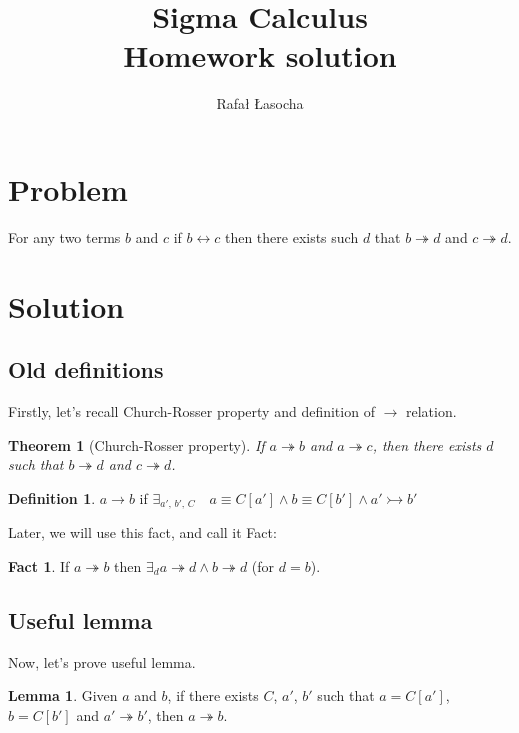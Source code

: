\documentclass[a4paper,11pt]{article}
\title{
  \textbf{Sigma Calculus}\\
  {\Large Homework solution}
}
\author{Rafał Łasocha}
\newtheorem{theorem}{Theorem}
\theoremstyle{definition}
\newtheorem*{lemma}{Lemma}
\newtheorem*{definition}{Definition}
\newtheorem*{fact}{Fact}
\begin{document}
\maketitle

\section{Problem}

For any two terms $b$ and $c$ if $b \leftrightarrow c$ then there exists such $d$ that $b \twoheadrightarrow d$
and $c \twoheadrightarrow d$.

\section{Solution}

\subsection{Old definitions}

Firstly, let's recall Church-Rosser property and definition of $\rightarrow$ relation.

\begin{theorem}[Church-Rosser property]
  If $a \twoheadrightarrow b$ and $a \twoheadrightarrow c$, then there exists $d$ such
  that $b \twoheadrightarrow d$ and $c \twoheadrightarrow d$.
\end{theorem}

\begin{definition}
  $a \rightarrow b$ if $\exists_{\text{$a'$, $b'$, $C$}} \quad a \equiv C[a'] \wedge b \equiv C[b'] \wedge a' \rightarrowtail b'$
\end{definition}

Later, we will use this fact, and call it Fact:

\begin{fact}
 If $a \twoheadrightarrow b$ then $\exists_d a \twoheadrightarrow d \wedge b \twoheadrightarrow d$ (for $d = b$).
\end{fact}

\subsection{Useful lemma}

Now, let's prove useful lemma.

\begin{lemma}
 Given $a$ and $b$, if there exists $C$, $a'$, $b'$ such that $a = C[a']$, $b = C[b']$ and $a' \twoheadrightarrow b'$,
 then $a \twoheadrightarrow b$.
\end{lemma}
\end{document}
